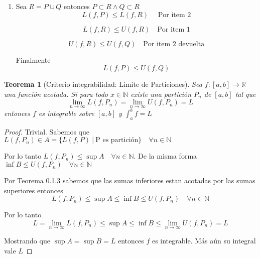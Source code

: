 \documentclass{article}
\theoremstyle{break}
\newtheorem{theorem}{Teorema}[section]
\begin{document}
\begin{enumerate}
\begin{proof}
	Y llegaremos a $U(f,A) \leq U(f,P)$. Etc

	\end{proof}

	\item Sea $R=P\cup Q$ entonces $P\subset R \land Q \subset R$
		\[
			L(f,P) \leq L(f,R) \quad \text{ Por item 2}
		\]

		\[
			L(f,R) \leq U(f,R) \quad \text {Por item 1}
		\]

		\[
			U(f,R) \leq U(f,Q) \quad \text{Por item 2 devuelta}
		\]

		Finalmente \[
			L(f,P) \leq U(f,Q)
		\]
	\end{enumerate}

\begin{theorem}[Criterio integrabilidad: Limite de Particiones]
	Sea $f:[a,b]\rightarrow \mathbb{R}$ una función acotada. Si para todo $x \in \mathbb{N}$ 
	existe una partición $P_n$ de $[a,b]$ tal que 
	\[ \lim_{n \rightarrow \infty} L(f,P_n) = \lim_{n \rightarrow \infty} U(f,P_n) = L \]
	entonces $f$ es integrable sobre $[a,b]$ y $\int_{a}^{b} f = L$
\end{theorem}
\begin{proof}
	Trivial. Sabemos que $L(f,P_n) \in A = \{L(f,P)\ | \ \text{P es partición}\} 
	\quad \forall n \in \mathbb{N}$

	Por lo tanto $L(f,P_n)\leq \sup A \quad \forall n \in \mathbb{N}$. De la misma forma $\inf B \leq U(f,P_n) \quad \forall n \in \mathbb{N}$

	Por Teorema 0.1.3 sabemos que las sumas inferiores estan acotadas por las sumas
	superiores entonces \[ L(f,P_n) \leq \sup A \leq \inf B \leq U(f,P_n) \quad \forall n \in \mathbb{N}\]

	Por lo tanto \[L= \lim_{n \rightarrow \infty} L(f,P_n) \leq  \sup A \leq \inf B
	\leq \lim_{n \rightarrow \infty} U(f,P_n) =L\]

	Mostrando que $\sup A = \sup B = L$ entonces $f$ es integrable. Más aún su integral vale $L$ 

\end{proof}
\end{document}
